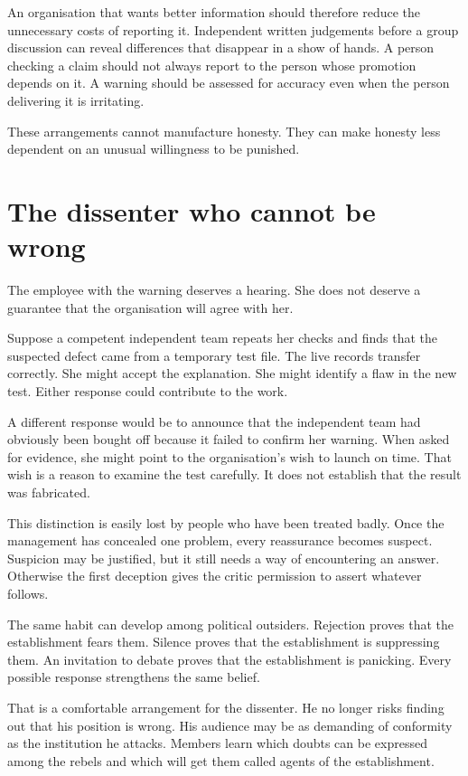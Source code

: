 \documentclass[12pt,a4paper]{book}
\begin{document}
An organisation that wants better information should therefore reduce the unnecessary costs of reporting it. Independent written judgements before a group discussion can reveal differences that disappear in a show of hands. A person checking a claim should not always report to the person whose promotion depends on it. A warning should be assessed for accuracy even when the person delivering it is irritating.

These arrangements cannot manufacture honesty. They can make honesty less dependent on an unusual willingness to be punished.

\section*{The dissenter who cannot be wrong}

The employee with the warning deserves a hearing. She does not deserve a guarantee that the organisation will agree with her.

Suppose a competent independent team repeats her checks and finds that the suspected defect came from a temporary test file. The live records transfer correctly. She might accept the explanation. She might identify a flaw in the new test. Either response could contribute to the work.

A different response would be to announce that the independent team had obviously been bought off because it failed to confirm her warning. When asked for evidence, she might point to the organisation's wish to launch on time. That wish is a reason to examine the test carefully. It does not establish that the result was fabricated.

This distinction is easily lost by people who have been treated badly. Once the management has concealed one problem, every reassurance becomes suspect. Suspicion may be justified, but it still needs a way of encountering an answer. Otherwise the first deception gives the critic permission to assert whatever follows.

The same habit can develop among political outsiders. Rejection proves that the establishment fears them. Silence proves that the establishment is suppressing them. An invitation to debate proves that the establishment is panicking. Every possible response strengthens the same belief.

That is a comfortable arrangement for the dissenter. He no longer risks finding out that his position is wrong. His audience may be as demanding of conformity as the institution he attacks. Members learn which doubts can be expressed among the rebels and which will get them called agents of the establishment.
\end{document}
